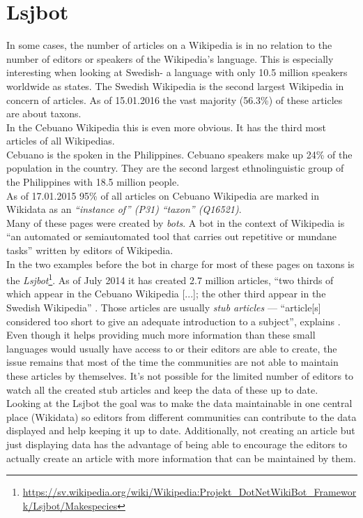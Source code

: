 \section{Lsjbot}
In some cases, the number of articles on a Wikipedia is in no relation to the number of editors or speakers of the Wikipedia's language. This is especially interesting when looking at Swedish- a language with only 10.5 million speakers worldwide as \citet{nlpd:01} states. The Swedish Wikipedia is the second largest Wikipedia in concern of articles. As of 15.01.2016 the vast majority (56.3\%) of these articles are about taxons. \\
In the Cebuano Wikipedia this is even more obvious. It has the third most articles of all Wikipedias. \\
Cebuano is the spoken in the Philippines. Cebuano speakers make up 24\% of the population in the country. \citep{cebuano:01} They are the second largest ethnolinguistic group of the Philippines with 18.5 million people. \citep{cebuano:02} \\
As of 17.01.2015 95\% of all articles on Cebuano Wikipedia are marked in Wikidata as an \textit{``instance of'' (P31)} \textit{``taxon'' (Q16521)}. \citep{wiki:07} \\
Many of these pages were created by \textit{bots}. A bot in the context of Wikipedia is ``an automated or semiautomated tool that carries out repetitive or mundane tasks'' \citep{wiki:08} written by editors of Wikipedia. \\
In the two examples before the bot in charge for most of these pages on taxons is the \textit{Lsjbot}\footnote{\url{https://sv.wikipedia.org/wiki/Wikipedia:Projekt_DotNetWikiBot_Framework/Lsjbot/Makespecies}}. As of July 2014 it has created 2.7 million articles, ``two thirds of which appear in the Cebuano Wikipedia [...]; the other third appear in the Swedish Wikipedia'' \citep{wiki:09}. Those articles are usually \textit{stub articles} --- ``article[s] considered too short to give an adequate introduction to a subject'', explains \citet{stubs}. \\
Even though it helps providing much more information than these small languages would usually have access to or their editors are able to create, the issue remains that most of the time the communities are not able to maintain these articles by themselves. It's not possible for the limited number of editors to watch all the created stub articles and keep the data of these up to date. \\
Looking at the Lsjbot the goal was to make the data maintainable in one central place (Wikidata) so editors from different communities can contribute to the data displayed and help keeping it up to date. Additionally, not creating an article but just displaying data has the advantage of being able to encourage the editors to actually create an article with more information that can be maintained by them.

